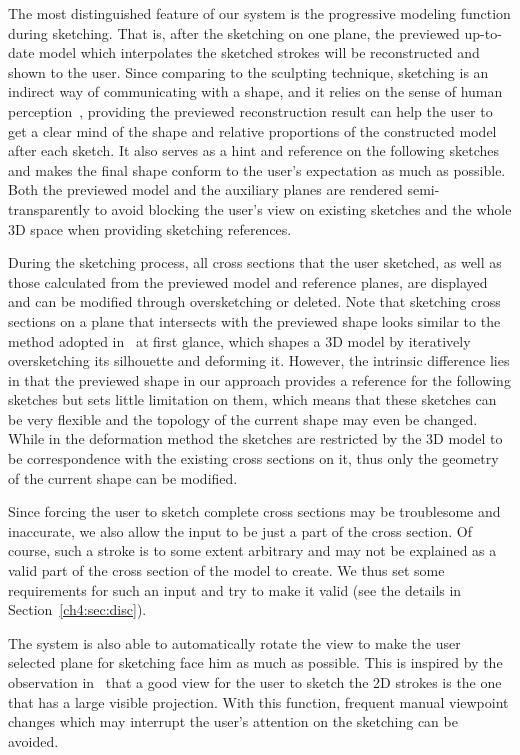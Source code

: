 The most distinguished feature of our system is the progressive
modeling function during sketching. That is, after the sketching on
one plane, the previewed up-to-date model which interpolates the
sketched strokes will be reconstructed and shown to the user. Since
comparing to the sculpting technique, sketching is an indirect way
of communicating with a shape, and it relies on the sense of human
perception~\cite{CIW08}, providing the previewed reconstruction
result can help the user to get a clear mind of the shape and
relative proportions of the constructed model after each sketch. It
also serves as a hint and reference on the following sketches and
makes the final shape conform to the user's expectation as much as
possible. Both the previewed model and the auxiliary planes are
rendered semi-transparently to avoid blocking the user's view on
existing sketches and the whole 3D space when providing sketching
references.

During the sketching process, all cross sections that  the user
sketched, as well as those calculated from the previewed model and
reference planes, are displayed and can be modified through
oversketching or deleted. Note that sketching cross sections on a
plane that intersects with the previewed shape looks similar to the
method adopted in~\cite{NSAC05,KSV09} at first glance, which shapes
a 3D model by iteratively oversketching its silhouette and deforming
it. However, the intrinsic difference lies in that the previewed
shape in our approach provides a reference for the following
sketches but sets little limitation on them, which means that these
sketches can be very flexible and the topology of the current shape
may even be changed. While in the deformation method the sketches
are restricted by the 3D model to be correspondence with the
existing cross sections on it, thus only the geometry of the current
shape can be modified.

Since forcing the user to sketch complete cross sections may be
troublesome and inaccurate, we also allow the input to be just a
part of the cross section. Of course, such a stroke is to some
extent arbitrary and may not be explained as a valid part of the
cross section of the model to create. We thus set some requirements
for such an input and try to make it valid (see the details in
Section~\ref{ch4:sec:disc}).

The system is also able to automatically rotate the view to make
the user selected plane for sketching face him as much as possible.
This is inspired by the observation in~\cite{BBS08} that a good view
for the user to sketch the 2D strokes is the one that has a large
visible projection. With this function, frequent manual viewpoint
changes which may interrupt the user's attention on the sketching
can be avoided.

